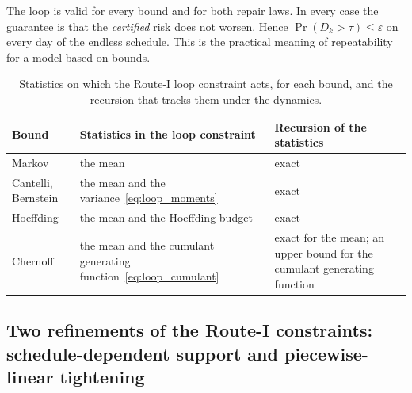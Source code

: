 \documentclass[11pt,a4paper]{article}
\theoremstyle{plain}
\theoremstyle{definition}
\theoremstyle{remark}
\begin{document}
The loop is valid for every bound and for both repair laws.
In every case the guarantee is that the \emph{certified} risk does not worsen.
Hence $\Pr(D_k > \tau) \le \varepsilon$ on every day of the endless schedule.
This is the practical meaning of repeatability for a model based on bounds.

\begin{table}[htbp]
\centering
\caption{Statistics on which the Route-I loop constraint acts, for each bound, and the recursion that tracks them under the dynamics.}
\label{tab:loop_routeI_bounds}
\small
\begin{tabularx}{\linewidth}{@{}>{\hsize=0.600\hsize\raggedright\arraybackslash}X>{\hsize=1.160\hsize\raggedright\arraybackslash}X>{\hsize=1.240\hsize\raggedright\arraybackslash}X@{}}
\toprule
\rowcolor{headgrey}
\textbf{Bound} & \textbf{Statistics in the loop constraint} & \textbf{Recursion of the statistics} \\
\midrule
Markov              & the mean & exact \\
Cantelli, Bernstein & the mean and the variance~\eqref{eq:loop_moments} & exact \\
Hoeffding           & the mean and the Hoeffding budget & exact \\
Chernoff            & the mean and the cumulant generating function~\eqref{eq:loop_cumulant} & exact for the mean; an upper bound for the cumulant generating function \\
\bottomrule
\end{tabularx}
\end{table}

\subsection{Two refinements of the Route-I constraints: schedule-dependent support and piecewise-linear tightening}
\label{sec:routeI_refinements}
\end{document}
